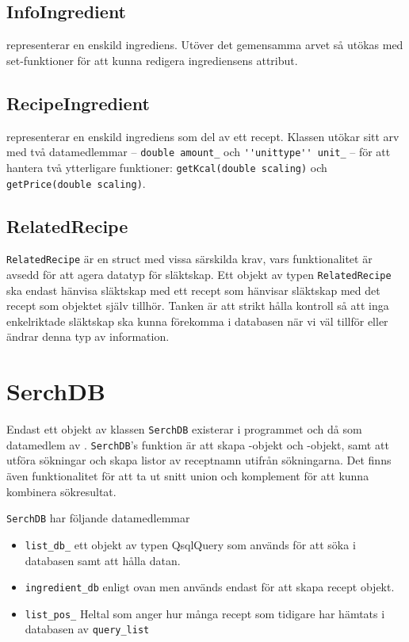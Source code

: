 \subsection{InfoIngredient}
\InfoIngredient{} representerar en enskild ingrediens. Utöver det gemensamma arvet så utökas \InfoIngredient{} med set-funktioner för att kunna redigera ingrediensens attribut.

\subsection{RecipeIngredient}
\RecipeIngredient{} representerar en enskild ingrediens som del av ett recept. Klassen utökar sitt arv med två datamedlemmar -- \verb=double amount_= och \verb=''unittype'' unit_= -- för att hantera två ytterligare funktioner: \verb+getKcal(double scaling)+ och \verb+getPrice(double scaling)+.
 
\subsection{RelatedRecipe}
\verb+RelatedRecipe+ är en struct med vissa särskilda krav, vars funktionalitet är avsedd för att agera datatyp för släktskap. Ett objekt av typen \verb+RelatedRecipe+ ska endast hänvisa släktskap med ett recept som hänvisar släktskap med det recept som objektet själv tillhör. Tanken är att strikt hålla kontroll så att inga enkelriktade släktskap ska kunna förekomma i databasen när vi väl tillför eller ändrar denna typ av information.



\section{SerchDB}
Endast ett objekt av klassen \verb+SerchDB+ existerar i programmet och då som
datamedlem av \Shell. \verb+SerchDB+'s funktion är att skapa \Recipe-objekt
och \InfoIngredient-objekt, samt att utföra sökningar och skapa listor av
receptnamn utifrån sökningarna. Det finns även funktionalitet för att ta ut
snitt union och komplement för att kunna kombinera sökresultat.

\verb+SerchDB+ har följande datamedlemmar
  \begin{itemize}
    \item \verb+list_db_+ ett objekt av typen QsqlQuery som används för att söka
      i databasen samt att hålla datan.
    \item \verb+ingredient_db+ enligt ovan men används endast för att skapa
      recept objekt.
    \item \verb+list_pos_+ Heltal som anger hur många recept som tidigare har
      hämtats i databasen av \verb+query_list+
  \end{itemize}

